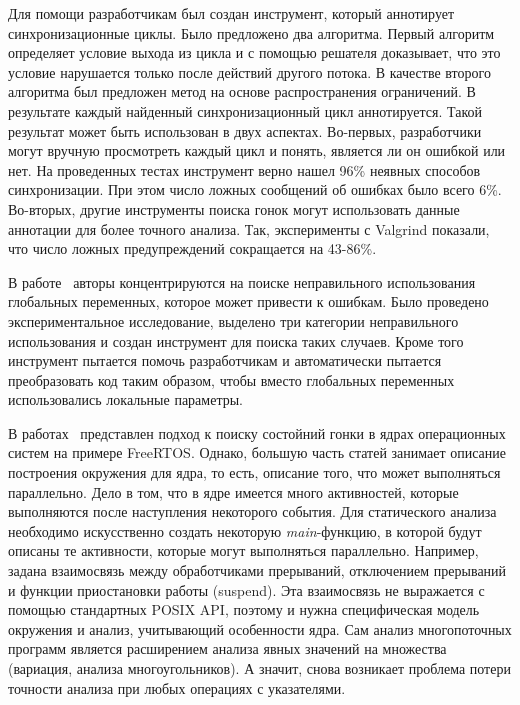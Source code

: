 Для помощи разработчикам был создан инструмент, который аннотирует синхронизационные циклы.
Было предложено два алгоритма.
Первый алгоритм определяет условие выхода из цикла и с помощью решателя доказывает, что это условие нарушается только после действий другого потока.
В качестве второго алгоритма был предложен метод на основе распространения ограничений.
В результате каждый найденный синхронизационный цикл аннотируется. Такой результат может быть использован в двух аспектах.
Во-первых, разработчики могут вручную просмотреть каждый цикл и понять, является ли он ошибкой или нет.
На проведенных тестах инструмент верно нашел 96\% неявных способов синхронизации. При этом число ложных сообщений об ошибках было всего 6\%.
Во-вторых, другие инструменты поиска гонок могут использовать данные аннотации для более точного анализа.
Так, эксперименты с Valgrind показали, что число ложных предупреждений сокращается на 43-86\%. 

В работе~\cite{Smith:2011:LGS} авторы концентрируются на поиске неправильного использования глобальных переменных, которое может привести к ошибкам.
Было проведено экспериментальное исследование, выделено три категории неправильного использования и создан инструмент для поиска таких случаев.
Кроме того инструмент пытается помочь разработчикам и автоматически пытается преобразовать код таким образом, чтобы вместо глобальных переменных использовались локальные параметры.

В работах~\cite{FreeRTOS,RacesFreeRtos} представлен подход к поиску состойний гонки в ядрах операционных систем на примере FreeRTOS. 
Однако, большую часть статей занимает описание построения окружения для ядра, то есть, описание того, что может выполняться параллельно. 
Дело в том, что в ядре имеется много активностей, которые выполняются после наступления некоторого события. 
Для статического анализа необходимо искусственно создать некоторую \textit{main}-функцию, в которой будут описаны те активности, которые могут выполняться параллельно. 
Например, задана взаимосвязь между обработчиками прерываний, отключением прерываний и функции приостановки работы (suspend). 
Эта взаимосвязь не выражается с помощью стандартных POSIX API, поэтому и нужна специфическая модель окружения и анализ, учитывающий особенности ядра. 
Сам анализ многопоточных программ является расширением анализа явных значений на множества (вариация, анализа многоугольников).
А значит, снова возникает проблема потери точности анализа при любых операциях с указателями.

